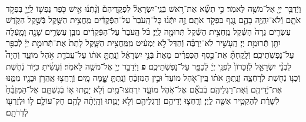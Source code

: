 \documentclass[twoside, openany, parskip=half, 11pt]{book}
\begin{document}
\begin{footnotesize}
\begin{multicols}{2}
\\
וַיְֿדַבֵּ֥ר יְיָ֖ אֶל־מֹשֶׁ֥ה לֵּאמֹֽר׃ כִּ֣י תִשָּׂ֞א אֶת־רֹ֥אשׁ בְּֿנֵֽי־יִשְׂרָאֵל֘ לִפְקֻֽדֵיהֶם֒ וְֿנָ֨תְֿנ֜וּ אִ֣ישׁ כֹּ֧פֶר נַפְשׁ֛וֹ לַֽיְיָ֖ בִּפְקֹ֣ד אֹתָ֑ם וְֿלֹא־יִֽהְיֶ֥ה בָהֶ֛ם נֶ֖גֶף בִּפְקֹ֥ד אֹתָֽם׃ זֶ֣ה יִתְּֿנ֗וּ כׇּל־הָֽעֹבֵר֙ עַל־הַפְּֿקֻדִ֔ים מַֽחֲצִ֥ית הַשֶּׁ֖קֶל בְּֿשֶׁ֣קֶל הַקֹּ֑דֶשׁ עֶשְׂרִ֤ים גֵּרָה֙ הַשֶּׁ֔קֶל מַֽחֲצִ֣ית הַשֶּׁ֔קֶל תְּֿרוּמָ֖ה לַֽיְיָ׃  כֹּ֗ל הָֽעֹבֵר֙ עַל־הַפְּֿקֻדִ֔ים מִבֶּ֛ן עֶשְׂרִ֥ים שָׁנָ֖ה וָמָ֑עְֿלָה יִתֵּ֖ן תְּֿרוּמַ֥ת יְיָ׃ הֶֽעָשִׁ֣יר לֹֽא־יַרְבֶּ֗ה וְֿהַדַּל֙ לֹ֣א יַמְעִ֔יט מִֽמַּֽחֲצִ֖ית הַשָּׁ֑קֶל לָתֵת֙ אֶת־תְּֿרוּמַ֣ת יְיָ֔ לְֿכַפֵּ֖ר עַל־נַפְשֹֽׁתֵיכֶֽם׃ וְֿלָֽקַחְתָּ֞ אֶת־כֶּ֣סֶף הַכִּפֻּרִ֗ים מֵאֵת֙ בְּֿנֵ֣י יִשְׂרָאֵ֔ל וְֿנָֽתַתָּ֣ אֹת֔וֹ עַל־עֲבֹדַ֖ת אֹ֣הֶל מוֹעֵ֑ד וְֿהָיָה֩ לִבְנֵ֨י יִשְׂרָאֵ֤ל לְֿזִכָּרוֹן֙ לִפְנֵ֣י יְיָ֔ לְֿכַפֵּ֖ר עַל־נַפְשֹֽׁתֵיכֶֽם׃ \textbf{פ}
וַיְֿדַבֵּ֥ר יְיָ֖ אֶל־מֹשֶׁ֥ה לֵּאמֹֽר׃ וְֿעָשִׂ֜יתָ כִּיּ֥וֹר נְֿחֹ֛שֶׁת וְֿכַנּ֥וֹ נְֿחֹ֖שֶׁת לְֿרָחְֿצָ֑ה וְֿנָֽתַתָּ֣ אֹת֗וֹ בֵּֽין־אֹ֤הֶל מוֹעֵד֙ וּבֵ֣ין הַמִּזְבֵּ֔חַ וְֿנָֽתַתָּ֥ שׇׇׇָׁ֖מָּה מָֽיִם׃ וְֿרָֽחֲצ֛וּ אַֽהֲרֹ֥ן וּבָנָ֖יו מִמֶּ֑נּוּ אֶת־יְֿדֵיהֶ֖ם וְֿאֶת־רַגְלֵיהֶֽם׃ בְּֿבֹאָ֞ם אֶל־אֹ֧הֶל מוֹעֵ֛ד יִרְחֲצוּ־מַ֖יִם וְֿלֹ֣א יָמֻ֑תוּ א֣וֹ בְֿגִשְׁתָּ֤ם אֶל־הַמִּזְבֵּ֨חַ֙ לְֿשָׁרֵ֔ת לְֿהַקְטִ֥יר אִשֶּׁ֖ה לַֽיְיָ׃ וְֿרָֽחֲצ֛וּ יְֿדֵיהֶ֥ם וְֿרַגְלֵיהֶ֖ם וְֿלֹ֣א יָמֻ֑תוּ וְֿהָֽיְֿתָ֨ה לָהֶ֧ם חָק־עוֹלָ֛ם ל֥וֹ וּלְזַרְע֖וֹ לְֿדֹֽרֹתָֽם׃


\end{multicols}
\end{footnotesize}
\end{document}
